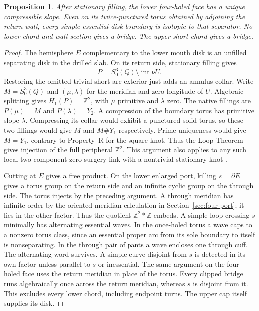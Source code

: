 \documentclass[11pt,letterpaper]{article}
\numberwithin{equation}{section}
\newtheorem{proposition}[theorem]{Proposition}
\theoremstyle{remark}
\begin{document}
\begin{proposition}\label{prop:opaque-return}
After stationary filling, the lower four-holed face has a unique
compressible slope. Even on its twice-punctured torus obtained by
adjoining the return wall, every simple essential disk boundary is
isotopic to that separator. No lower chord and wall section gives a
bridge. The upper short chord gives a bridge.
\end{proposition}
\begin{proof}
The hemisphere \(E\) complementary to the lower mouth disk is an
unfilled separating disk in the drilled slab. On its return side,
stationary filling gives
\[
 P=S^3_0(Q)\setminus\operatorname{int}\nu U.
\]
Restoring the omitted trivial short-arc exterior just adds an annulus
collar. Write \(M=S^3_0(Q)\) and \((\mu,\lambda)\) for the meridian and
zero longitude of \(U\). Algebraic splitting gives
\(H_1(P)=\mathbb Z^2\), with \(\mu\) primitive and \(\lambda\) zero.
The native fillings are \(P(\mu)=M\) and \(P(\lambda)=Y_2\).
A compression of the boundary torus has primitive slope \(\lambda\).
Compressing its collar would exhibit a punctured solid torus, so
these two fillings would give \(M\) and \(M\#Y_1\) respectively.
Prime uniqueness would give \(M=Y_1\), contrary to Property~R for
the square knot. Thus the Loop Theorem gives injection of the full
peripheral \(\mathbb Z^2\). This argument also applies to any such
local two-component zero-surgery link with a nontrivial stationary
knot \cite[Theorem 1.1 and Figure 5]{GompfScharlemannThompson2010}.

Cutting at \(E\) gives a free product. On the lower enlarged port,
killing \(s=\partial E\) gives a torus group on the return side and
an infinite cyclic group on the through side. The torus injects by
the preceding argument. A through meridian has infinite order by
the oriented meridian calculation in Section~\ref{sec:four-port};
it lies in the other factor. Thus the quotient
\(\mathbb Z^2*\mathbb Z\) embeds. A simple loop crossing \(s\)
minimally has alternating essential waves. In the once-holed torus
a wave caps to a nonzero torus class, since an essential proper
arc from its sole boundary to itself is nonseparating. In the
through pair of pants a wave encloses one through cuff.
The alternating word survives. A simple curve disjoint from \(s\)
is detected in its own factor unless parallel to \(s\) or inessential.
The same argument on the four-holed face uses the return meridian
in place of the torus. Every clipped bridge runs algebraically once
across the return meridian, whereas \(s\) is disjoint from it.
This excludes every lower chord, including endpoint turns. The
upper cap itself supplies its disk.
\end{proof}
\end{document}
